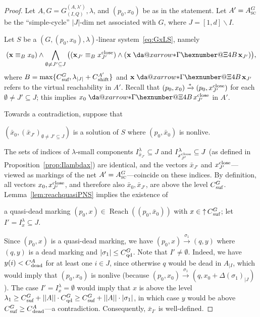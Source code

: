 \documentclass[11pt,a4paper]{amsart}
\makeatletter
\DeclareMathOperator{\Reach}{Reach}
\newcommand{\step}[1]{\mathrel{\xrightarrow{#1}}}
\newcommand{\reach}{\step{*}}
\newcommand{\virtual}[1]{\mathrel{\xdashrightarrow{#1}}\hspace{-0.3em}}
\newcommand{\vreach}{\virtual{*}}
\newcommand{\bvar}[1]{\mathbf{#1}}
\newcommand{\nnorm}[1]{||#1||}
\newcommand{\upC}[1]{\mathop{\uparrow}#1}
\newcommand{\dead}{{}_\textnormal{dead}}
\newcommand{\suf}{{}_\textnormal{suf}}
\newcommand{\shift}{{}_\textnormal{shift}}
\newcommand{\close}{\textnormal{close}}
\newcommand{\qd}{{}_\textnormal{qd}}
\newcommand{\ASC}{A_{\textsc{sc}}}
\newcommand{\restr}[1]{_{|{#1}}}
\newcommand*{\da@rightarrow}{\mathchar"0\hexnumber@\symAMSa 4B }
\newcommand*{\xdashrightarrow}[2][]{%
  \mathrel{%
    \mathpalette{\da@xarrow{#1}{#2}{}\da@rightarrow{\,}{}}{}%
  }%
}
\newcommand*{\da@xarrow}[7]{%
  \sbox0{$\ifx#7\scriptstyle\scriptscriptstyle\else\scriptstyle\fi#5#1#6\m@th$}%
  \sbox2{$\ifx#7\scriptstyle\scriptscriptstyle\else\scriptstyle\fi#5#2#6\m@th$}%
  \sbox4{$#7\dabar@\m@th$}%
  \dimen@=\wd0 %
  \ifdim\wd2 >\dimen@
    \dimen@=\wd2 %
  \fi
  \count@=2 %
  \def\da@bars{\dabar@\dabar@}%
  \@whiledim\count@\wd4<\dimen@\do{%
    \advance\count@\@ne
    \expandafter\def\expandafter\da@bars\expandafter{%
      \da@bars
      \dabar@ 
    }%
  }%
  \mathrel{#3}%
  \mathrel{%
    \mathop{\da@bars}\limits
    \ifx\\#1\\%
    \else
      _{\copy0}%
    \fi
    \ifx\\#2\\%
    \else
      ^{\copy2}%
    \fi
  }%
  \mathrel{#4}%
}
\let\origtextsc\textsc
\renewcommand{\textsc}[1]{\textnormal{\origtextsc{#1}}}
\theoremstyle{plain}
\theoremstyle{definition}
\theoremstyle{defC}
\theoremstyle{thmC}
\makeatother
\begin{document}
\begin{proof}
Let $A,G=G_{(I,Q)}^{(A,\lambda')},\lambda$, and $(p_0,x_0)$ be as in
	the statement.
Let $A'=\ASC^G$ be the ``simple-cycle'' $|J|$-dim net associated with
	$G$, where $J=[1,d]\smallsetminus I$.

	Let $S$ be a $(G,(p_0,x_0),\lambda)$-linear
	system~\eqref{eq:GxLS}, namely
\begin{equation*}
	(\bvar{x}\equiv_B x_0)
	\land
	\bigwedge_{\emptyset\neq J'\subseteq
	J}\big((\bvar{x}_{J'}\equiv_B x^\close_{J'})\land
	(\bvar{x}\virtual{*}\bvar{x}_{J'})\big),
\end{equation*}
	where $B=\max\{C\suf^G,\lambda_{|J|}+C\shift^{A'}\}$
and
	$\bvar{x}\virtual{*}\bvar{x}_{J'}$ refers to the virtual
	reachability in $A'$. 
	Recall that $(p_0,x_0)\reach (p_0,x^\close_{J'})$ for each
	$\emptyset\neq J'\subseteq J$; this implies $x_0\vreach
	x^\close_{J'}$ in $A'$.

Towards a contradiction, suppose that
	\begin{center}
		$(\bar{x}_0,(\bar{x}_{J'})_{\emptyset\neq J'\subseteq
		J})$ is a solution of $S$
		where $(p_0,\bar{x}_0)$ is nonlive. 
	\end{center}
	The sets of indices of $\lambda$-small components 
	$I^{\lambda}_{\bar{x}_{J'}}\subseteq J$ and
	$I^{\lambda}_{x^\close_{J'}}\subseteq J$
	(as defined in	Proposition~\ref{prop:Ilambdax}) are
	identical,
	and the vectors $\bar{x}_{J'}$ and $x^\close_{J'}$---viewed as
	markings of the net $A'=\ASC^G$---coincide on
	these indices.
	By definition, all vectors $x_0,x^\close_{J'}$, and therefore also 
	$\bar{x}_0, \bar{x}_{J'}$, are above the level $C\suf^G$.
	Lemma~\ref{lem:reachquasiPNS} implies the existence of
	\begin{center}
	a quasi-dead
		marking $(p_0,x)\in\Reach((p_0,\bar{x}_0))$ with
		$x\in\upC{C\suf^G}$; let
		$I'=I^{\lambda}_{x}\subseteq J$. 
	\end{center}		
	Since $(p_0,x)$ is a quasi-dead marking, we have
	$(p_0,x)\step{\sigma_1}(q,y)$ where
	$(q,y)$ is a dead marking and
	$|\sigma_1|\leq C\qd^G$.  
Note that $I'\neq\emptyset$.
	Indeed, we have $y(i)< C\dead^A$
	for at least one $i\in J$, since otherwise $q$ would be dead
	in $A\restr{I}$, which would imply that $(p_0,x_0)$ is
	nonlive (because
	$(p_0,x_0)\step{\sigma_1}(q,x_0+\Delta(\sigma_1)\restr{J})$). 
	The case $I'=I^{\lambda}_{x}=\emptyset$ would imply
that $x$ is above the level $\lambda_1\geq C\suf^G+\nnorm{A}\cdot
	C\qd^G\geq C\suf^G+\nnorm{A}\cdot |\sigma_1|$, in which case $y$ would be above $C\suf^G\geq
	C\dead^A$---a contradiction. Consequently, 
	$\bar{x}_{I'}$ is well-defined.


\end{proof}
\end{document}

